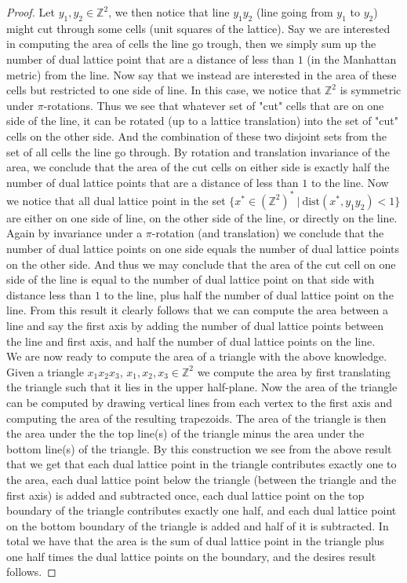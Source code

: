 \documentclass[a4paper,11pt]{article}
\newcommand{\Z}{\mathbb{Z}}
\numberwithin{equation}{section}
\begin{document}
\begin{proof}
	Let $ y_1,y_2\in \Z^2 $, we then notice that line $ y_1y_2 $ (line going from $ y_1 $ to $ y_2 $) might cut through some cells (unit squares of the lattice). Say we are interested in computing the area of cells the line go trough, then we simply sum up the number of dual lattice point that are a distance of less than $ 1 $ (in the Manhattan metric) from the line. Now say that we instead are interested in the area of these cells but restricted to one side of line. In this case, we notice that $ \Z^2 $ is symmetric under $ \pi $-rotations. Thus we see that whatever set of "cut" cells that are on one side of the line, it can be rotated (up to a lattice translation) into the set of "cut" cells on the other side. And the combination of these two disjoint sets from the set of all cells the line go through. By rotation and translation invariance of the area, we conclude that the area of the cut cells on either side is exactly half the number of dual lattice points that are a distance of less than $ 1 $ to the line. Now we notice that all dual lattice point in the set $ \{x^*\in(\Z^2)^*\ \vert\ \text{dist}(x^*,y_1y_2)<1\} $ are either on one side of line, on the other side of the line, or directly on the line. Again by invariance under a $ \pi $-rotation (and translation) we conclude that the number of dual lattice points on one side equals the number of dual lattice points on the other side. And thus we may conclude that the area of the cut cell on one side of the line is equal to the number of dual lattice point on that side with distance less than $ 1 $ to the line, plus half the number of dual lattice point on the line. From this result it clearly follows that we can compute the area between a line and say the first axis by adding the number of dual lattice points between the line and first axis, and half the number of dual lattice points on the line.\\
	We are now ready to compute the area of a triangle with the above knowledge. Given a triangle $ x_1x_2x_3 $, $ x_1,x_2,x_3\in\Z^2 $ we compute the area by first translating the triangle such that it lies in the upper half-plane.  Now the area of the triangle can be computed by drawing vertical lines from each vertex to the first axis and computing the area of the resulting trapezoids. The area of the triangle is then the area under the the top line(s) of the triangle minus the area under the bottom line(s) of the triangle. By this construction we see from the above result that we get that each dual lattice point in the triangle contributes exactly one to the area, each dual lattice point below the triangle (between the triangle and the first axis) is added and subtracted once, each dual lattice point on the top boundary of the triangle contributes exactly one half, and each dual lattice point on the bottom boundary of the triangle is added and half of it is subtracted. In total we have that the area is the sum of dual lattice point in the triangle plus one half times the dual lattice points on the boundary, and the desires result follows.
\end{proof}
\end{document}
